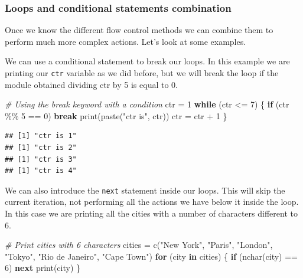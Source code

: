 \documentclass[
]{book}
\newenvironment{Shaded}{\begin{snugshade}}{\end{snugshade}}
\newcommand{\CommentTok}[1]{\textcolor[rgb]{0.56,0.35,0.01}{\textit{#1}}}
\newcommand{\ControlFlowTok}[1]{\textcolor[rgb]{0.13,0.29,0.53}{\textbf{#1}}}
\newcommand{\DecValTok}[1]{\textcolor[rgb]{0.00,0.00,0.81}{#1}}
\newcommand{\FunctionTok}[1]{\textcolor[rgb]{0.00,0.00,0.00}{#1}}
\newcommand{\NormalTok}[1]{#1}
\newcommand{\OtherTok}[1]{\textcolor[rgb]{0.56,0.35,0.01}{#1}}
\newcommand{\SpecialCharTok}[1]{\textcolor[rgb]{0.00,0.00,0.00}{#1}}
\newcommand{\StringTok}[1]{\textcolor[rgb]{0.31,0.60,0.02}{#1}}
\theoremstyle{definition}
\theoremstyle{definition}
\theoremstyle{definition}
\theoremstyle{definition}
\theoremstyle{remark}
\begin{document}
\hypertarget{loops-and-conditional-statements-combination}{%
\subsubsection{Loops and conditional statements combination}\label{loops-and-conditional-statements-combination}}

Once we know the different flow control methods we can combine them to perform much more complex actions. Let's look at some examples.

We can use a conditional statement to break our loops. In this example we are printing our \texttt{ctr} variable as we did before, but we will break the loop if the module obtained dividing ctr by 5 is equal to 0.

\begin{Shaded}
\begin{Highlighting}[]
\CommentTok{\# Using the break keyword with a condition}
\NormalTok{ctr }\OtherTok{=} \DecValTok{1}
\ControlFlowTok{while}\NormalTok{ (ctr }\SpecialCharTok{\textless{}=} \DecValTok{7}\NormalTok{) \{}
  \ControlFlowTok{if}\NormalTok{ (ctr }\SpecialCharTok{\%\%} \DecValTok{5} \SpecialCharTok{==} \DecValTok{0}\NormalTok{)}
    \ControlFlowTok{break}
  \FunctionTok{print}\NormalTok{(}\FunctionTok{paste}\NormalTok{(}\StringTok{"ctr is"}\NormalTok{, ctr))}
\NormalTok{  ctr }\OtherTok{=}\NormalTok{ ctr }\SpecialCharTok{+} \DecValTok{1}
\NormalTok{\}}
\end{Highlighting}
\end{Shaded}

\begin{verbatim}
## [1] "ctr is 1"
## [1] "ctr is 2"
## [1] "ctr is 3"
## [1] "ctr is 4"
\end{verbatim}

We can also introduce the \texttt{next} statement inside our loops. This will skip the current iteration, not performing all the actions we have below it inside the loop. In this case we are printing all the cities with a number of characters different to 6.

\begin{Shaded}
\begin{Highlighting}[]
\CommentTok{\# Print cities with 6 characters}
\NormalTok{cities }\OtherTok{=} \FunctionTok{c}\NormalTok{(}\StringTok{"New York"}\NormalTok{, }\StringTok{"Paris"}\NormalTok{, }\StringTok{"London"}\NormalTok{, }\StringTok{"Tokyo"}\NormalTok{, }\StringTok{"Rio de Janeiro"}\NormalTok{, }\StringTok{"Cape Town"}\NormalTok{)}
\ControlFlowTok{for}\NormalTok{ (city }\ControlFlowTok{in}\NormalTok{ cities) \{}
  \ControlFlowTok{if}\NormalTok{ (}\FunctionTok{nchar}\NormalTok{(city) }\SpecialCharTok{==} \DecValTok{6}\NormalTok{)}
    \ControlFlowTok{next}
  \FunctionTok{print}\NormalTok{(city)}
\NormalTok{\}}
\end{Highlighting}
\end{Shaded}
\end{document}
